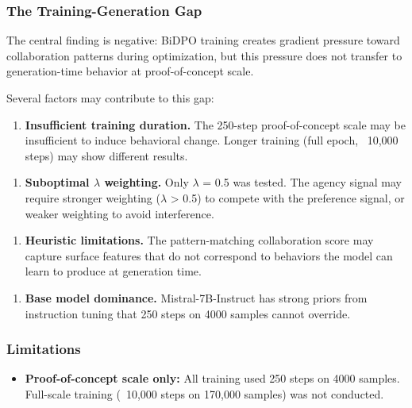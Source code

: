 
\subsubsection{The Training-Generation Gap}

The central finding is negative: BiDPO training creates gradient pressure toward collaboration patterns during optimization, but this pressure does not transfer to generation-time behavior at proof-of-concept scale.

Several factors may contribute to this gap:

\begin{enumerate}
\item \textbf{Insufficient training duration.} The 250-step proof-of-concept scale may be insufficient to induce behavioral change. Longer training (full epoch, ~10,000 steps) may show different results.
\end{enumerate}

\begin{enumerate}
\item \textbf{Suboptimal $\lambda$ weighting.} Only $\lambda$ = 0.5 was tested. The agency signal may require stronger weighting ($\lambda$ > 0.5) to compete with the preference signal, or weaker weighting to avoid interference.
\end{enumerate}

\begin{enumerate}
\item \textbf{Heuristic limitations.} The pattern-matching collaboration score may capture surface features that do not correspond to behaviors the model can learn to produce at generation time.
\end{enumerate}

\begin{enumerate}
\item \textbf{Base model dominance.} Mistral-7B-Instruct has strong priors from instruction tuning that 250 steps on 4000 samples cannot override.
\end{enumerate}

\subsubsection{Limitations}

\begin{itemize}
\item \textbf{Proof-of-concept scale only:} All training used 250 steps on 4000 samples. Full-scale training (~10,000 steps on 170,000 samples) was not conducted.
\end{itemize}

